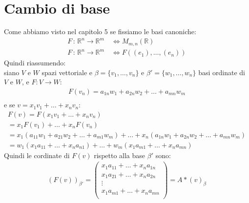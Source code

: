 \documentclass{article}
\begin{document}
\section{Cambio di base}
Come abbiamo visto nel capitolo 5 se fissiamo le basi canoniche:
\begin{align*}
  F \, : \, \mathbb{R}^n \to \mathbb{R}^m \quad \iff M_{m,n}(\mathbb{R}) \\
  F \, : \, \mathbb{R}^n \to \mathbb{R}^m \quad \iff F((e_1),\dots,(e_n))
\end{align*}
Quindi riassumendo: \\
siano $V$ e $W$ spazi vettoriale e $\beta=\{v_1,\dots,v_n\}$ e $\beta'=\{w_1,\dots,w_n\}$ basi ordinate di $V$ e $W$, e $F : V \to W$:
\begin{align*}
  F(v_n)=a_{1n}w_1+a_{2n}w_2+\dots+a_{mn}w_m \\
\end{align*}
e se $v=x_1v_1+\dots+x_nv_n$:
\begin{align*}
  F(v)=F(x_1v_1+\dots+x_nv_n) \\
  = x_1F(v_1)+\dots+x_nF(v_n) \\
  = x_1(a_{11}w_1+a_{21}w_2+\dots+a_{m1}w_m) + \dots + x_n(a_{1n}w_1+a_{2n}w_2+\dots+a_{mn}w_m) \\
  = w_1(x_1a_{11}+\dots+x_na_{n1})+\dots+w_m(x_1a_{m1}+\dots+x_na_{mn})
\end{align*}
Quindi le cordinate di $F(v)$ rispetto alla base $\beta'$ sono:
\begin{align*}
  (F(v))_{\beta'}=\begin{pmatrix}
    x_1a_{11}+\dots+x_na_{1n} \\
    x_1a_{21}+\dots+x_na_{2n} \\
    \vdots \\
    x_1a_{m1}+\dots+x_na_{mn} \\
  \end{pmatrix}
  = A*(v)_\beta
\end{align*}
\end{document}

